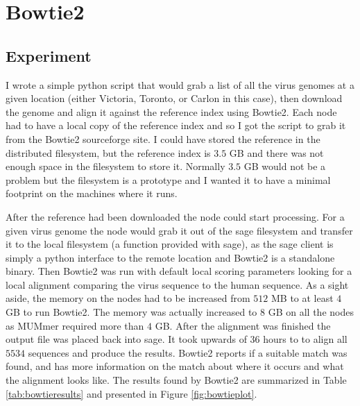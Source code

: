 

\section{Bowtie2}

\subsection{Experiment}

I wrote a simple python script that would grab a list of all the virus genomes at a given location (either Victoria, Toronto, or Carlon in this case), then download the genome and align it against the reference index using Bowtie2. Each node had to have a local copy of the reference index and so I got the script to grab it from the Bowtie2 sourceforge site. I could have stored the reference in the distributed filesystem, but the reference index is $3.5$ GB and there was not enough space in the filesystem to store it. Normally $3.5$ GB would not be a problem but the filesystem is a prototype and I wanted it to have a minimal footprint on the machines where it runs. 

After the reference had been downloaded the node could start processing. For a given virus genome the node would grab it out of the sage filesystem and transfer it to the local filesystem (a function provided with sage), as the sage client is simply a python interface to the remote location and Bowtie2 is a standalone binary. Then Bowtie2 was run with default local scoring parameters looking for a local alignment comparing the virus sequence to the human sequence. As a sight aside, the memory on the nodes had to be increased from $512$ MB to at least $4$ GB to run Bowtie2. The memory was actually increased to $8$ GB on all the nodes as MUMmer required more than $4$ GB. After the alignment was finished the output file was placed back into sage. It took upwards of $36$ hours to to align all $5534$ sequences and produce the results. Bowtie2 reports if a suitable match was found, and has more information on the match about where it occurs and what the alignment looks like. The results found by Bowtie2 are summarized in Table \ref{tab:bowtieresults} and presented in Figure \ref{fig:bowtieplot}.



